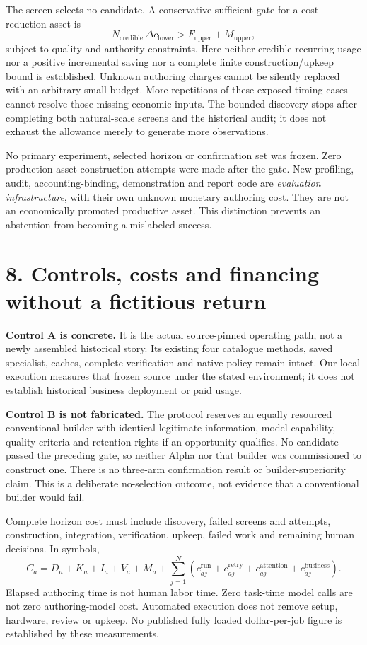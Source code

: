 \documentclass[11pt,letterpaper]{article}
\newcommand{\sect}[1]{\section*{#1}}
\begin{document}
The screen selects no candidate. A conservative sufficient gate for a cost-reduction asset is
\[
N_{\mathrm{credible}}\,\Delta c_{\mathrm{lower}}
> F_{\mathrm{upper}}+M_{\mathrm{upper}},
\]
subject to quality and authority constraints. Here neither credible recurring usage nor a positive incremental saving nor a complete finite construction/upkeep bound is established. Unknown authoring charges cannot be silently replaced with an arbitrary small budget. More repetitions of these exposed timing cases cannot resolve those missing economic inputs. The bounded discovery stops after completing both natural-scale screens and the historical audit; it does not exhaust the allowance merely to generate more observations.

No primary experiment, selected horizon or confirmation set was frozen. Zero production-asset construction attempts were made after the gate. New profiling, audit, accounting-binding, demonstration and report code are \emph{evaluation infrastructure}, with their own unknown monetary authoring cost. They are not an economically promoted productive asset. This distinction prevents an abstention from becoming a mislabeled success.

\sect{8. Controls, costs and financing without a fictitious return}
\textbf{Control A is concrete.} It is the actual source-pinned operating path, not a newly assembled historical story. Its existing four catalogue methods, saved specialist, caches, complete verification and native policy remain intact. Our local execution measures that frozen source under the stated environment; it does not establish historical business deployment or paid usage.

\textbf{Control B is not fabricated.} The protocol reserves an equally resourced conventional builder with identical legitimate information, model capability, quality criteria and retention rights if an opportunity qualifies. No candidate passed the preceding gate, so neither Alpha nor that builder was commissioned to construct one. There is no three-arm confirmation result or builder-superiority claim. This is a deliberate no-selection outcome, not evidence that a conventional builder would fail.

Complete horizon cost must include discovery, failed screens and attempts, construction, integration, verification, upkeep, failed work and remaining human decisions. In symbols,
\[
C_a=D_a+K_a+I_a+V_a+M_a+
\sum_{j=1}^{N}\left(c^{\mathrm{run}}_{aj}+c^{\mathrm{retry}}_{aj}
+c^{\mathrm{attention}}_{aj}+c^{\mathrm{business}}_{aj}\right).
\]
Elapsed authoring time is not human labor time. Zero task-time model calls are not zero authoring-model cost. Automated execution does not remove setup, hardware, review or upkeep. No published fully loaded dollar-per-job figure is established by these measurements.
\end{document}
